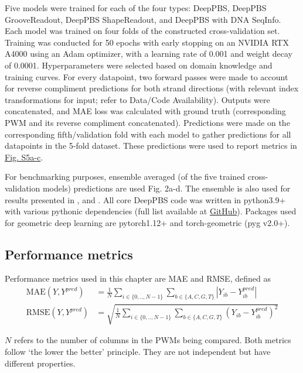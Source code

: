 Five models were trained for each of the four types: DeepPBS, DeepPBS GrooveReadout, DeepPBS ShapeReadout, and DeepPBS with DNA SeqInfo. Each model was trained on four folds of the constructed cross-validation set. Training was conducted for 50 epochs with early stopping on an NVIDIA RTX A4000 using an Adam \citep{Kingma2017} optimizer, with a learning rate of 0.001 and weight decay of 0.0001. Hyperparameters were selected based on domain knowledge and training curves. For every datapoint, two forward passes were made to account for reverse compliment predictions for both strand directions (with relevant index transformations for input; refer to Data/Code Availability). Outputs were concatenated, and MAE loss was calculated with ground truth (corresponding PWM and its reverse compliment concatenated). Predictions were made on the corresponding fifth/validation fold with each model to gather predictions for all datapoints in the 5-fold dataset. These predictions were used to report metrics in \hyperref[fig:pdnaS5]{Fig. S5a-c}. 

For benchmarking purposes, ensemble averaged (of the five trained cross-validation models) predictions are used Fig. 2a-d. The ensemble is also used for results presented in , and . All core DeepPBS code was written in python3.9+ with various pythonic dependencies (full list available at \href{https://github.com/timkartar/DeepPBS}{GitHub}). Packages used for geometric deep learning are pytorch1.12+ and torch-geometric (pyg v2.0+).

\subsection{Performance metrics}

Performance metrics used in this chapter are MAE and RMSE, defined as 
\begin{align*}
\text{MAE}(Y, Y^{pred}) &= \frac{1}{N} 
\sum\limits_{i\in\{0,..,N-1\}} \sum\limits_{b\in\{A,C,G,T\}} |Y_{ib} - Y_{ib}^{pred}|\\
\text{RMSE}(Y, Y^{pred}) &= \sqrt{\frac{1}{N} \sum\limits_{i\in\{0,..,N-1\}} \sum\limits_{b\in\{A,C,G,T\}} (Y_{ib} - Y_{ib}^{pred})^2}
\end{align*}

$N$ refers to the number of columns in the PWMs being compared. Both metrics follow ‘the lower the better’ principle. They are not independent but have different properties. 

